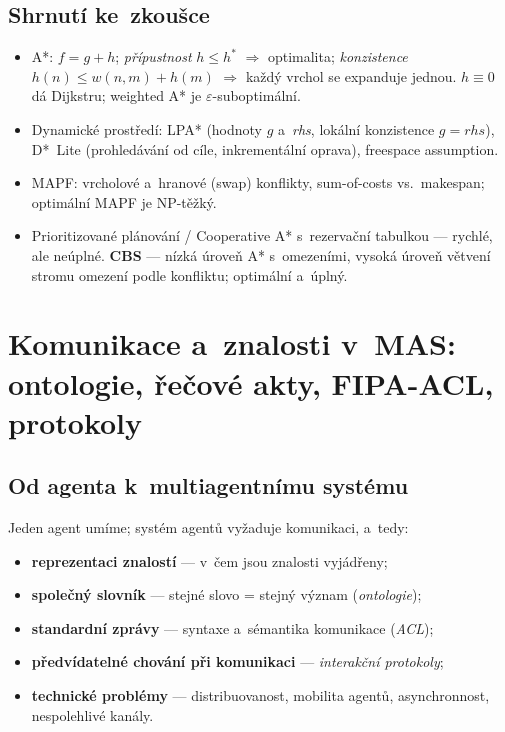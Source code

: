\documentclass[11pt,a4paper]{article}
\theoremstyle{definition}
\begin{document}
\subsection{Shrnutí ke~zkoušce}

\begin{itemize}
\item A*: $f = g+h$; \emph{přípustnost} $h \le h^*$ $\Rightarrow$ optimalita;
  \emph{konzistence} $h(n) \le w(n,m)+h(m)$ $\Rightarrow$ každý vrchol se expanduje jednou.
  $h\equiv 0$ dá Dijkstru; weighted A* je $\varepsilon$-suboptimální.
\item Dynamické prostředí: LPA* (hodnoty $g$ a~\emph{rhs}, lokální konzistence
  $g=\mathit{rhs}$), D*~Lite (prohledávání od cíle, inkrementální oprava), freespace assumption.
\item MAPF: vrcholové a~hranové (swap) konflikty, sum-of-costs vs.\ makespan;
  optimální MAPF je NP-těžký.
\item Prioritizované plánování / Cooperative A* s~rezervační tabulkou --- rychlé, ale neúplné.
  \textbf{CBS} --- nízká úroveň A* s~omezeními, vysoká úroveň větvení stromu omezení podle
  konfliktu; optimální a~úplný.
\end{itemize}

\section{Komunikace a~znalosti v~MAS: ontologie, řečové akty, FIPA-ACL, protokoly}
\label{sec:komunikace}
\subsection{Od agenta k~multiagentnímu systému}

Jeden agent umíme; systém agentů vyžaduje komunikaci, a~tedy:
\begin{itemize}
\item \textbf{reprezentaci znalostí} --- v~čem jsou znalosti vyjádřeny;
\item \textbf{společný slovník} --- stejné slovo = stejný význam (\emph{ontologie});
\item \textbf{standardní zprávy} --- syntaxe a~sémantika komunikace (\emph{ACL});
\item \textbf{předvídatelné chování při komunikaci} --- \emph{interakční protokoly};
\item \textbf{technické problémy} --- distribuovanost, mobilita agentů, asynchronnost,
  nespolehlivé kanály.
\end{itemize}
\end{document}
